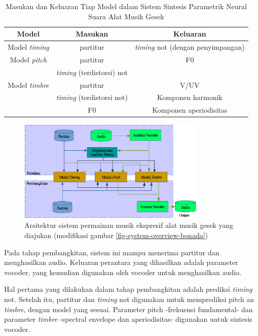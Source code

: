 \begin{table}[h]
    \centering
    \caption{Masukan dan Keluaran Tiap Model dalam Sistem Sintesis Parametrik Neural Suara Alat Musik Gesek }\label{tab-models-in-out}
    \begin{tabular}{ |c|c|c| } 
     \hline
     Model & Masukan & Keluaran \\
     \hline 
     Model \textit{timing} & partitur & \textit{timing} not (dengan penyimpangan) \\ 
     \hline
     Model \textit{pitch} & partitur & F0 \\ 
      & \textit{timing} (terdistorsi) not  & \\ 
     \hline
     Model \textit{timbre} & partitur & V/UV \\ 
      & \textit{timing} (terdistorsi not)  & Komponen harmonik\\ 
      & F0  & Komponen aperiodisitas\\ 
     \hline
    \end{tabular}
\end{table}

\begin{figure}[h]
    \centering
    \includegraphics[width=0.8\textwidth]{resources/system-overview.eps}
    \caption{Arsitektur sistem permainan musik ekspresif alat musik gesek yang diajukan (modifikasi gambar \ref{fig-system-overview-bonada})}\label{fig-system-overview}
\end{figure}

Pada tahap pembangkitan, sistem ini mampu menerima partitur dan menghasilkan audio. Keluaran perantara yang dihasilkan adalah parameter vocoder, yang kemudian digunakan oleh vocoder untuk menghasilkan audio.

Hal pertama yang dilakukan dalam tahap pembangkitan adalah prediksi \textit{timing} not. Setelah itu, partitur dan \textit{timing} not digunakan untuk memprediksi pitch an \textit{timbre}, dengan model yang sesuai. Parameter pitch -frekuensi fundamental- dan parameter \textit{timbre} -spectral envelope dan aperiodisitas- digunakan untuk sintesis vocoder.

